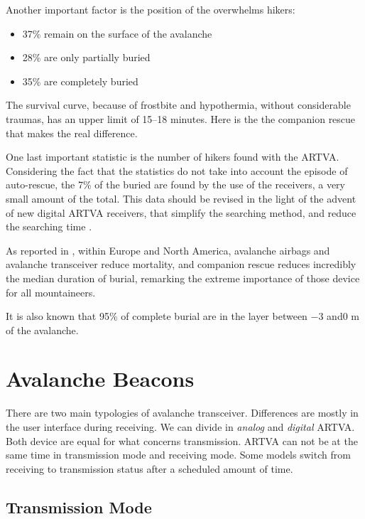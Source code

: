 Another important factor is the position of the overwhelms hikers:
\begin{itemize}
\item 37\% remain on the surface of the avalanche
\item 28\% are only partially buried
\item 35\% are completely buried
\end{itemize}

The survival curve, because of frostbite and hypothermia, without considerable traumas, has an upper limit of 15--18 minutes. Here is the the companion rescue that makes the real difference\cite{ManualeSciAlpinismo}.

One last important statistic is the number of hikers found with the ARTVA. Considering the fact that the statistics do not take into account the episode of auto-rescue, the 7\% of the buried are found by the use of the receivers, a very small amount of the total. This data should be revised in the light of the advent of new digital ARTVA receivers, that simplify the searching method, and reduce the searching time \citep{hereforddigital}. 

As reported in \citep{Brugger2007}, within Europe and North America, avalanche airbags and avalanche transceiver reduce mortality, and companion rescue reduces incredibly the median duration of burial, remarking the extreme importance of those device for all mountaineers.

It is also known that 95\% of complete burial are in the layer between \num{-3} and\num{0} \si{\meter} of the avalanche.

\section{Avalanche Beacons}

There are two main typologies of avalanche transceiver. Differences are mostly in the user interface during receiving. We can divide in \emph{analog} and \emph{digital} ARTVA. Both device are equal for what concerns transmission. ARTVA can not be at the same time in transmission mode and receiving mode. Some models switch from receiving to transmission status after a scheduled amount of time. 

\subsection{Transmission Mode}

